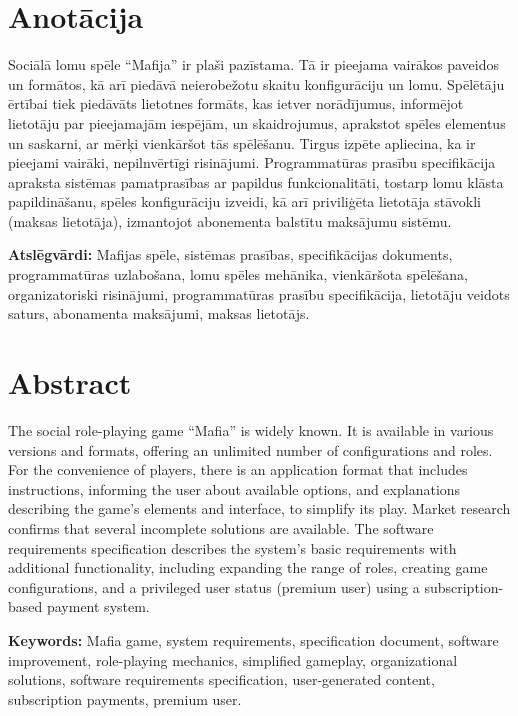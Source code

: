 \section*{Anotācija}
\setcounter{page}{2}
Sociālā lomu spēle ``Mafija'' ir plaši pazīstama.
Tā ir pieejama vairākos paveidos un formātos, kā arī piedāvā neierobežotu skaitu konfigurāciju un lomu.
Spēlētāju ērtībai tiek piedāvāts lietotnes formāts, kas ietver norādījumus, informējot lietotāju par pieejamajām iespējām, un skaidrojumus, aprakstot spēles elementus un saskarni, ar mērķi vienkāršot tās spēlēšanu.
Tirgus izpēte apliecina, ka ir pieejami vairāki, nepilnvērtīgi risinājumi.
Programmatūras prasību specifikācija apraksta sistēmas pamatprasības ar papildus funkcionalitāti, tostarp lomu klāsta papildināšanu, spēles konfigurāciju izveidi, kā arī priviliģēta lietotāja stāvokli (maksas lietotāja), izmantojot abonementa balstītu maksājumu sistēmu.

\textbf{Atslēgvārdi:}
Mafijas spēle, sistēmas prasības, specifikācijas dokuments, programmatūras uzlabošana, lomu spēles mehānika, vienkāršota spēlēšana, organizatoriski risinājumi, programmatūras prasību specifikācija, lietotāju veidots saturs, abonamenta maksājumi, maksas lietotājs.

\section*{Abstract}
The social role-playing game ``Mafia'' is widely known.
It is available in various versions and formats, offering an unlimited number of configurations and roles.
For the convenience of players, there is an application format that includes instructions, informing the user about available options, and explanations describing the game's elements and interface, to simplify its play.
Market research confirms that several incomplete solutions are available.
The software requirements specification describes the system's basic requirements with additional functionality, including expanding the range of roles, creating game configurations, and a privileged user status (premium user) using a subscription-based payment system.

\textbf{Keywords:}
Mafia game, system requirements, specification document, software improvement, role-playing mechanics, simplified gameplay, organizational solutions, software requirements specification, user-generated content, subscription payments, premium user.
